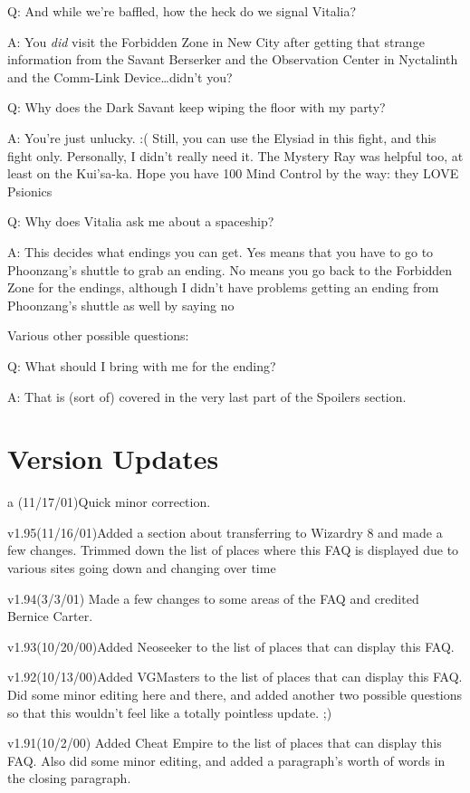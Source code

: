 \documentclass[12pt]{article}
\begin{document}
Q: And while we're baffled, how the heck do we signal Vitalia?

A: You \emph{did} visit the Forbidden Zone in New City after getting
that strange information from the Savant Berserker and the Observation
Center in Nyctalinth and the Comm-Link Device\ldots{}didn't you?

Q: Why does the Dark Savant keep wiping the floor with my party?

A: You're just unlucky. :( Still, you can use the Elysiad in this fight,
and this fight only. Personally, I didn't really need it. The Mystery
Ray was helpful too, at least on the Kui'sa-ka. Hope you have 100 Mind
Control by the way: they LOVE Psionics

Q: Why does Vitalia ask me about a spaceship?

A: This decides what endings you can get. Yes means that you have to go
to Phoonzang's shuttle to grab an ending. No means you go back to the
Forbidden Zone for the endings, although I didn't have problems getting
an ending from Phoonzang's shuttle as well by saying no

Various other possible questions:

Q: What should I bring with me for the ending?

A: That is (sort of) covered in the very last part of the Spoilers
section.

\section{Version Updates}\label{version-updates}

a (11/17/01)Quick minor correction.

v1.95(11/16/01)Added a section about transferring to Wizardry 8 and made
a few changes. Trimmed down the list of places where this FAQ is
displayed due to various sites going down and changing over time

v1.94(3/3/01) Made a few changes to some areas of the FAQ and credited
Bernice Carter.

v1.93(10/20/00)Added Neoseeker to the list of places that can display
this FAQ.

v1.92(10/13/00)Added VGMasters to the list of places that can display
this FAQ. Did some minor editing here and there, and added another two
possible questions so that this wouldn't feel like a totally pointless
update. ;)

v1.91(10/2/00) Added Cheat Empire to the list of places that can display
this FAQ. Also did some minor editing, and added a paragraph's worth of
words in the closing paragraph.
\end{document}
